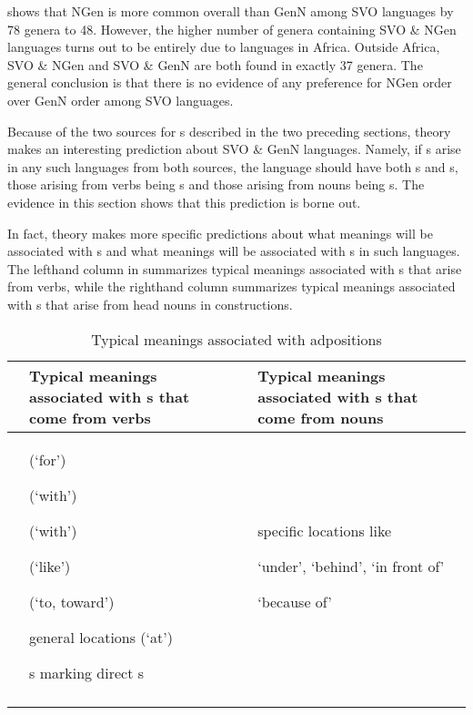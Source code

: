 \documentclass[output=paper]{langsci/langscibook}
\begin{document}
 shows that NGen is more common overall than GenN among SVO languages by 78 genera to 48. However, the higher number of genera containing SVO \& NGen languages turns out to be entirely due to languages in Africa. Outside Africa, SVO \& NGen and SVO \& GenN are both found in exactly 37 genera. The general conclusion is that there is no evidence of any preference for NGen order over GenN order among SVO languages.

Because of the two  sources for s described in the two preceding sections,  theory makes an interesting prediction about SVO \& GenN languages. Namely, if s arise in any such languages from both  sources, the language should have both s and s, those arising from verbs being s and those arising from nouns being s. The evidence in this section shows \largerpage that this prediction is borne out.

In fact,  theory makes more specific predictions about what meanings will be associated with s and what meanings will be associated with s in such languages. The lefthand column in  summarizes typical meanings associated with s that arise from verbs, while the righthand column summarizes typical meanings associated with s that arise from head nouns in  constructions.

\begin{table}
\caption{Typical meanings associated with adpositions} 
\label{extab:dryer:10}
\begin{tabularx}{\textwidth}{lXlQ}
\lsptoprule
\bfseries & \bfseries Typical meanings associated with s that come from verbs & \bfseries & \bfseries Typical meanings associated with s that come from nouns\\
\midrule 
 & { (‘for’)}

{ (‘with’)}

{ (‘with’)}

{ (‘like’)}

{ (‘to, toward’)}

{general locations (‘at’)}

s marking direct s &  & {specific locations like}

{‘under’, ‘behind’, ‘in front of’}

‘because of’\\
\lspbottomrule
\end{tabularx}
\end{table}
\end{document}
